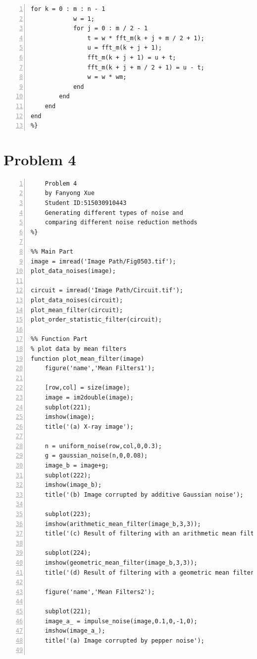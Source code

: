 \documentclass[11pt,oneside]{book}
\begin{document}
\begin{appendices}
\begin{lstlisting}[numbers=left, numberstyle=\tiny,keywordstyle=\color{blue!70},commentstyle=\color{red!50!green!50!blue!50},frame=shadowbox, rulesepcolor=\color{red!20!green!20!blue!20}]
        for k = 0 : m : n - 1
            w = 1;
            for j = 0 : m / 2 - 1
                t = w * fft_m(k + j + m / 2 + 1);
                u = fft_m(k + j + 1);
                fft_m(k + j + 1) = u + t;
                fft_m(k + j + m / 2 + 1) = u - t;
                w = w * wm;
            end
        end
    end
end
%}
\end{lstlisting}



\section{Problem 4}

\begin{lstlisting}[numbers=left, numberstyle=\tiny,keywordstyle=\color{blue!70},commentstyle=\color{red!50!green!50!blue!50},frame=shadowbox, rulesepcolor=\color{red!20!green!20!blue!20}] 
%{
    Problem 4
    by Fanyong Xue
    Student ID:515030910443
    Generating different types of noise and 
    comparing different noise reduction methods
%}

%% Main Part
image = imread('Image Path/Fig0503.tif');
plot_data_noises(image);

circuit = imread('Image Path/Circuit.tif');
plot_data_noises(circuit);
plot_mean_filter(circuit);
plot_order_statistic_filter(circuit);

%% Function Part
% plot data by mean filters
function plot_mean_filter(image)
    figure('name','Mean Filters1');
    
    [row,col] = size(image);
    image = im2double(image);
    subplot(221);
    imshow(image);
    title('(a) X-ray image');
    
    n = uniform_noise(row,col,0,0.3);
    g = gaussian_noise(n,0,0.08);
    image_b = image+g;
    subplot(222);
    imshow(image_b);
    title('(b) Image corrupted by additive Gaussian noise');
    
    subplot(223);
    imshow(arithmetic_mean_filter(image_b,3,3));
    title('(c) Result of filtering with an arithmetic mean filter');
    
    subplot(224);
    imshow(geometric_mean_filter(image_b,3,3));
    title('(d) Result of filtering with a geometric mean filter');
    
    figure('name','Mean Filters2');
    
    subplot(221);
    image_a_ = impulse_noise(image,0.1,0,-1,0);
    imshow(image_a_);
    title('(a) Image corrupted by pepper noise');
    

\end{lstlisting}
\end{appendices}
\end{document}
